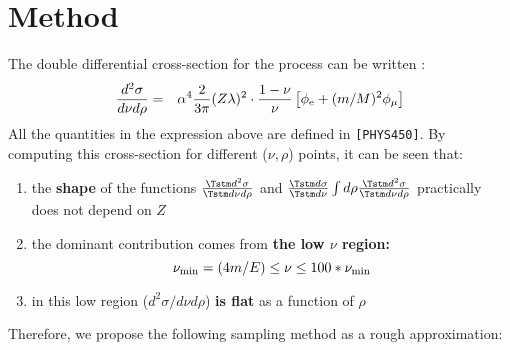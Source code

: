 \section{Method }
The double differential cross-section for the
process can be written \cite{bib-LOHM}:
 \begin{eqnarray}
\frac {d^2 \sigma}{d\nu d \rho}&=& \alpha^4\frac
     {2} {3 \pi} (Z \lambda)^2 \cdot  \frac {1-\nu}{\nu}\left [\phi_{\rm e} +
     (m/M)^2
     \phi_{\mu} \right ]
\end{eqnarray}
All the quantities in the expression above are defined in {\tt [PHYS450]}.
 By computing this cross-section for different
($\nu,\rho$) points, it can be seen that:
\begin{enumerate}
\item
the {\bf shape} of the functions
$\frac{\Tstm d^2 \sigma}{\Tstm d\nu d\rho}$
and
$\frac{\Tstm d \sigma}{\Tstm d\nu}\int d \rho \frac {\Tstm d^2 \sigma}
{\Tstm d\nu d\rho}$
practically does not depend on $Z$
\item
the dominant contribution comes from {\bf the low $\nu$ region:}
\begin{equation}
 \nu_{\rm min} = (4m/E)  \leq \nu  \leq  100*\nu_{\rm min}
\end{equation}
\item
in this low region ($d^2\sigma/d\nu d\rho$)
{\bf is flat} as a function of $\rho$
\end{enumerate}
Therefore, we propose the following sampling method as a rough approximation:

